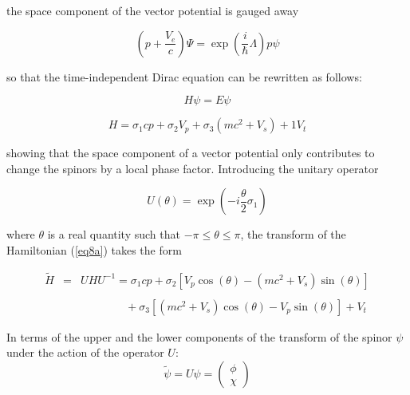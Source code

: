 \documentclass[a4paper,12pt,titlepage]{article}
\begin{document}
\noindent the space component of the vector potential is gauged away

\begin{equation}
\left( p+\frac{V_{e}}{c}\right) \Psi =\exp \left( \frac{i}{\hbar }\Lambda
\right) p\psi  \label{eq7}
\end{equation}

\noindent so that the time-independent Dirac equation can be rewritten as
follows:

\begin{equation}
H\psi =E\psi  \label{eq8}
\end{equation}

\begin{equation}
H=\sigma _{1}cp+\sigma _{2}V_{p}+\sigma _{3}\left( mc^{2}+V_{s}\right)
+1V_{t}  \label{eq8a}
\end{equation}

\noindent showing that the space component of a vector potential only
contributes to change the spinors by a local phase factor. Introducing the
unitary operator

\begin{equation}
U(\theta )=\exp \left( -i\frac{\theta }{2}\sigma _{1}\right)  \label{eq9}
\end{equation}

\noindent where $\theta $ is a real quantity such that $-\pi \leq \theta
\leq \pi $, the transform of the Hamiltonian (\ref{eq8a}) takes the form

\begin{eqnarray}
\widetilde{H} &=&UHU^{-1}=\sigma _{1}cp+\sigma _{2}\left[ V_{p}\cos \left(
\theta \right) -\left( mc^{2}+V_{s}\right) \sin \left( \theta \right) \right]
\nonumber \\
&&\qquad  \label{eq10} \\
&&\qquad \quad \quad +\sigma _{3}\left[ \left( mc^{2}+V_{s}\right) \cos
\left( \theta \right) -V_{p}\sin \left( \theta \right) \right] +V_{t}
\nonumber
\end{eqnarray}

\noindent In terms of the upper and the lower components of the transform of
the spinor $\psi $ under the action of the operator $U$:
\begin{equation}
\widetilde{\psi }=U\psi =\left(
\begin{array}{c}
\phi \\
\chi
\end{array}
\right)  \label{eq11}
\end{equation}
\end{document}
